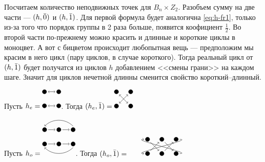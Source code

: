 Посчитаем количество неподвижных точек для $B_n \times Z_2$. Разобъем
сумму на две части --- $(h, \Bar 0)$ и $(h, \Bar 1)$. Для первой формула будет
аналогична \ref{eq:h-fr1}, только из-за того что порядок группы в 2 раза больше,
появится коофициент $\frac{1}{2}$. 
Во второй части по-прежнему можно красить и длинные и короткие циклы в моноцвет.
А вот с бицветом происходит любопытная вещь --- предположим мы красим в него
цикл (пару циклов, в случае короткого). Тогда реальный цикл от $(h, \Bar 1)$
будет получатся из циклов $h$ добавлением <<смены грани>> на каждом шаге. 
Значит для циклов нечетной длинны сменится свойство короткий--длинный. 
\begin{example}
Пусть $h_e = 
\begin{tikzpicture}
\draw [<->] (5pt, 0pt) -- (15pt, 0pt);
\draw [<->] (5pt, 20pt) -- (15pt, 20pt);
\draw[fill] (0pt,0pt) circle (3pt);
\draw[fill] (0pt, 20pt) circle (3pt);
\draw[fill] (20pt, 0pt) circle (3pt);
\draw[fill] (20pt, 20pt) circle (3pt);
\end{tikzpicture}
$.
Тогда $(h_e, \Bar 1) = 
\begin{tikzpicture}
\draw [<->] (4pt, 4pt) -- (16pt, 16pt);
\draw [<->] (4pt, 16pt) -- (16pt, 4pt);
\draw[fill] (0pt,0pt) circle (3pt);
\draw[fill] (0pt, 20pt) circle (3pt);
\draw[fill] (20pt, 0pt) circle (3pt);
\draw[fill] (20pt, 20pt) circle (3pt);
\end{tikzpicture}
$
\end{example}
\begin{example}
Пусть $h_o = 
\begin{tikzpicture}
\draw [->] (5pt, 0pt) -- (15pt, 0pt);
\draw [->] (5pt, 20pt) -- (15pt, 20pt);
\draw [->] (25pt, 0pt) -- (35pt, 0pt);
\draw [->] (25pt, 20pt) -- (35pt, 20pt);
\draw [->] (40pt, -5pt) to [out=-135,in=-45] (0pt, -5pt);
\draw [->] (40pt, 25pt) to [out=135,in=45] (0pt, 25pt);
 
\draw[fill] (0pt,0pt) circle (3pt);
\draw[fill] (0pt, 20pt) circle (3pt);
\draw[fill] (20pt, 0pt) circle (3pt);
\draw[fill] (20pt, 20pt) circle (3pt);
\draw[fill] (40pt, 0pt) circle (3pt);
\draw[fill] (40pt, 20pt) circle (3pt);
\end{tikzpicture}
$.
Тогда $(h_o, \Bar 1) = 
\begin{tikzpicture}
\draw [->] (4pt, 4pt) -- (16pt, 16pt);
\draw [->] (4pt, 16pt) -- (16pt, 4pt);
\draw [->] (24pt, 4pt) -- (36pt, 16pt);
\draw [->] (24pt, 16pt) -- (36pt, 4pt);
\draw [->] (45pt, 20pt) to [out=0,in=180] (-5pt, 0pt);
\draw [->] (45pt, 0pt) to [out=0,in=180] (-5pt, 20pt);
 
\draw[fill] (0pt,0pt) circle (3pt);
\draw[fill] (0pt, 20pt) circle (3pt);
\draw[fill] (20pt, 0pt) circle (3pt);
\draw[fill] (20pt, 20pt) circle (3pt);
\draw[fill] (40pt, 0pt) circle (3pt);
\draw[fill] (40pt, 20pt) circle (3pt);
\end{tikzpicture}
$
\end{example}

